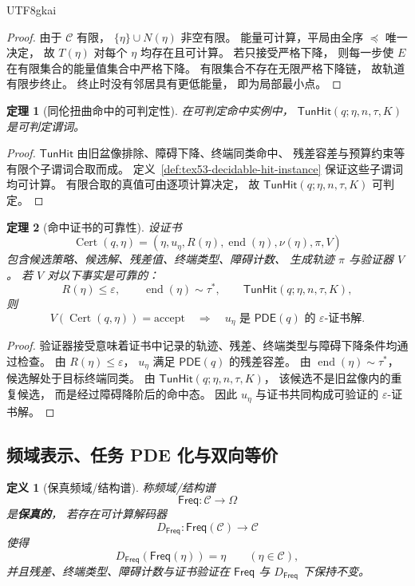\documentclass[12pt]{article}
\newtheorem{definition}{定义}[section]
\newtheorem{theorem}{定理}[section]
\newcommand{\PDE}{\mathsf{PDE}}
\newcommand{\TunHit}{\mathsf{TunHit}}
\newcommand{\Freq}{\mathsf{Freq}}
\newcommand{\Cert}{\operatorname{Cert}}
\newcommand{\Endp}{\operatorname{end}}
\begin{document}
\begin{CJK*}{UTF8}{gkai}
\begin{proof}
由于 \(\mathcal C\) 有限，
\(\{\eta\}\cup N(\eta)\) 非空有限。
能量可计算，平局由全序 \(\preceq\) 唯一决定，
故 \(T(\eta)\) 对每个 \(\eta\) 均存在且可计算。
若只接受严格下降，
则每一步使 \(E\) 在有限集合的能量值集合中严格下降。
有限集合不存在无限严格下降链，
故轨道有限步终止。
终止时没有邻居具有更低能量，
即为局部最小点。
\end{proof}

\begin{theorem}[同伦扭曲命中的可判定性]
\label{thm:tex53-tunhit-decidable}
在可判定命中实例中，
\(\TunHit(q;\eta,n,\tau,K)\) 是可判定谓词。
\end{theorem}

\begin{proof}
\(\TunHit\) 由旧盆像排除、障碍下降、终端同类命中、
残差容差与预算约束等有限个子谓词合取而成。
定义~\ref{def:tex53-decidable-hit-instance} 保证这些子谓词均可计算。
有限合取的真值可由逐项计算决定，
故 \(\TunHit(q;\eta,n,\tau,K)\) 可判定。
\end{proof}

\begin{theorem}[命中证书的可靠性]
\label{thm:tex53-certificate-soundness}
设证书
\[
  \Cert(q,\eta)
  =
  (\eta,u_\eta,R(\eta),\Endp(\eta),\nu(\eta),\pi,V)
\]
包含候选策略、候选解、残差值、终端类型、障碍计数、
生成轨迹 \(\pi\) 与验证器 \(V\)。
若 \(V\) 对以下事实是可靠的：
\[
  R(\eta)\le\varepsilon,\qquad
  \Endp(\eta)\sim\tau^\ast,\qquad
  \TunHit(q;\eta,n,\tau,K),
\]
则
\[
  V(\Cert(q,\eta))=\mathrm{accept}
  \quad\Longrightarrow\quad
  u_\eta
  \text{ 是 } \PDE(q) \text{ 的 }\varepsilon\text{-证书解}.
\]
\end{theorem}

\begin{proof}
验证器接受意味着证书中记录的轨迹、残差、终端类型与障碍下降条件均通过检查。
由 \(R(\eta)\le\varepsilon\)，
\(u_\eta\) 满足 \(\PDE(q)\) 的残差容差。
由 \(\Endp(\eta)\sim\tau^\ast\)，
候选解处于目标终端同类。
由 \(\TunHit(q;\eta,n,\tau,K)\)，
该候选不是旧盆像内的重复候选，
而是经过障碍降阶后的命中态。
因此 \(u_\eta\) 与证书共同构成可验证的 \(\varepsilon\)-证书解。
\end{proof}

\subsection{频域表示、任务 PDE 化与双向等价}
\label{subsec:tex53-equivalence-closure}

\begin{definition}[保真频域/结构谱]
\label{def:tex53-faithful-frequency}
称频域/结构谱
\[
  \Freq:\mathcal C\to\Omega
\]
是\textbf{保真的}，
若存在可计算解码器
\[
  D_\Freq:\Freq(\mathcal C)\to\mathcal C
\]
使得
\[
  D_\Freq(\Freq(\eta))=\eta
  \qquad(\eta\in\mathcal C),
\]
并且残差、终端类型、障碍计数与证书验证在 \(\Freq\) 与 \(D_\Freq\) 下保持不变。
\end{definition}


\end{CJK*}
\end{document}
